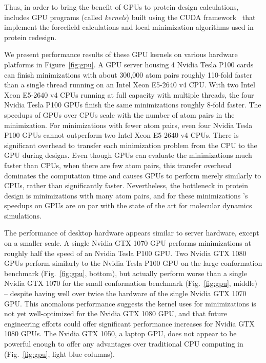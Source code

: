 Thus, in order to bring the benefit of GPUs to protein design calculations,  includes GPU programs (called {\it kernels}) built using the CUDA framework~\cite{nvidia2010programming} that implement the forcefield calculations and local minimization algorithms used in protein redesign.

We present performance results of these GPU kernels on various hardware platforms in Figure~\ref{fig:gpu}. A GPU server housing 4 Nvidia Tesla P100 cards can finish minimizations with about 300,000 atom pairs roughly 110-fold faster than a single thread running on an Intel Xeon E5-2640 v4 CPU. With two Intel Xeon E5-2640 v4 CPUs running at full capacity with multiple threads, the four Nvidia Tesla P100 GPUs finish the same minimizations roughly 8-fold faster. The speedups of GPUs over CPUs scale with the number of atom pairs in the minimization. For minimizations with fewer atom pairs, even four Nvidia Tesla P100 GPUs cannot outperform two Intel Xeon E5-2640 v4 CPUs. There is significant overhead to transfer each minimization problem from the CPU to the GPU during designs. Even though GPUs can evaluate the minimizations much faster than CPUs, when there are few atom pairs, this transfer overhead dominates the computation time and causes GPUs to perform merely similarly to CPUs, rather than significantly faster.  Nevertheless, the bottleneck in protein design is minimizations with many atom pairs, and for these minimizations \osprey's speedups on GPUs are on par with the state of the art for molecular dynamics simulations.  

The performance of desktop hardware appears similar to server hardware, except on a smaller scale. A single Nvidia GTX 1070 GPU performs minimizations at roughly half the speed of an Nvidia Tesla P100 GPU. Two Nvidia GTX 1080 GPUs perform similarly to the Nvidia Tesla P100 GPU on the large conformation benchmark (Fig.~\ref{fig:gpu}, bottom), but actually perform worse than a single Nvidia GTX 1070 for the small conformation benchmark (Fig.~\ref{fig:gpu}, middle) -- despite having well over twice the hardware of the single Nvidia GTX 1070 GPU. This anomalous performance suggests the kernel  uses for minimizations is not yet well-optimized for the Nvidia GTX 1080 GPU, and that future engineering efforts could offer significant performance increases for Nvidia GTX 1080 GPUs. The Nvidia GTX 1050, a laptop GPU, does not appear to be powerful enough to offer any advantages over traditional CPU computing in  (Fig.~\ref{fig:gpu}, light blue columns).

